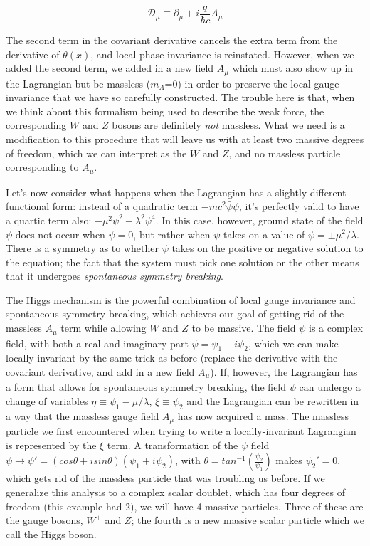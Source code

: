 \begin{equation}
\mathscr{D}_\mu \equiv \partial_\mu + i\frac{q}{\hbar c}A_\mu
\end{equation}

The second term in the covariant derivative cancels the extra term from the derivative of $\theta(x)$, and local phase invariance is reinstated.  However, when we added the second term, we added in a new field $A_\mu$ which must also show up in the Lagrangian but be massless ($m_A$=0) in order to preserve the local gauge invariance that we have so carefully constructed.  The trouble here is that, when we think about this formalism being used to describe the weak force, the corresponding $W$ and $Z$ bosons are definitely \textit{not} massless.  What we need is a modification to this procedure that will leave us with at least two massive degrees of freedom, which we can interpret as the $W$ and $Z$, and no massless particle corresponding to $A_\mu$.

Let's now consider what happens when the Lagrangian has a slightly different functional form: instead of a quadratic term $-mc^2\bar{\psi}\psi$, it's perfectly valid to have a quartic term also: $-\mu^2\psi^2+\lambda^2 \psi^4$.  In this case, however, ground state of the field $\psi$ does not occur when $\psi=0$, but rather when $\psi$ takes on a value of $\psi = \pm \mu^2/\lambda$.  There is a symmetry as to whether $\psi$ takes on the positive or negative solution to the equation; the fact that the system must pick one solution or the other means that it undergoes \textit{spontaneous symmetry breaking}.

The Higgs mechanism is the powerful combination of local gauge invariance and spontaneous symmetry breaking, which achieves our goal of getting rid of the massless $A_\mu$ term while allowing $W$ and $Z$ to be massive.  The field $\psi$ is a complex field, with both a real and imaginary part $\psi=\psi_1+i\psi_2$, which we can make locally invariant by the same trick as before (replace the derivative with the covariant derivative, and add in a new field $A_\mu$).  If, however, the Lagrangian has a form that allows for spontaneous symmetry breaking, the field $\psi$ can undergo a change of variables $\eta\equiv \psi_1 - \mu/\lambda$, $\xi\equiv \psi_2$ and the Lagrangian can be rewritten in a way that the massless gauge field $A_\mu$ has now acquired a mass.  The massless particle we first encountered when trying to write a locally-invariant Lagrangian is represented by the $\xi$ term.  A transformation of the $\psi$ field $\psi \rightarrow \psi' = (cos\theta + i sin\theta)(\psi_1+i\psi_2)$, with $\theta=tan^{-1}(\frac{\psi_2}{\psi_1})$ makes $\psi_2'=0$, which gets rid of the massless particle that was troubling us before.  If we generalize this analysis to a  complex scalar doublet, which has four degrees of freedom (this example had 2), we will have 4 massive particles.  Three of these are the gauge bosons, $W^\pm$ and $Z$; the fourth is a new massive scalar particle which we call the Higgs boson.



